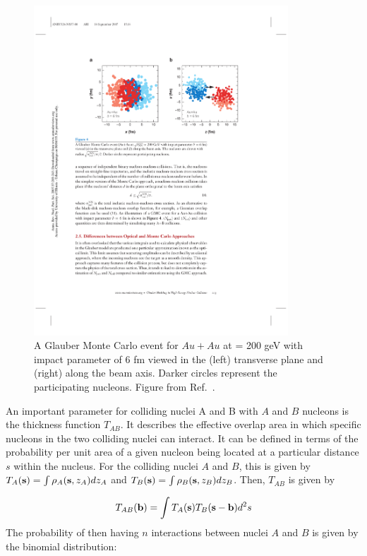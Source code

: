 \begin{figure}[htbp]
\begin{center}
\includegraphics[width=0.85\textwidth]{figures/theory/glauberMC}
\caption{A Glauber Monte Carlo event for $Au+Au$ at \sqrtsnn = 200 geV with impact parameter of 6 fm viewed in the (left) transverse plane and (right) along the beam axis.
Darker circles represent the participating nucleons.
Figure from Ref.~\cite{doi:10.1146/annurev.nucl.57.090506.123020}.}
\label{fig:glauberMC}
\end{center}
\end{figure}

An important parameter for colliding nuclei A and B with $A$ and $B$ nucleons is the thickness function $T_{AB}$.
It describes the effective overlap area in which specific nucleons in the two colliding nuclei can interact.
It can be defined in terms of the probability per unit area of a given nucleon being located at a particular distance $s$ within the nucleus.
For the colliding nuclei $A$ and $B$, this is given by $T_{A}({\bf{s}}) = \int \rho_A ({\bf{s}}, z_A) dz_{A}$ and $T_{B}({\bf{s}}) = \int \rho_B ({\bf{s}}, z_B) dz_{B}$.
Then, $T_{AB}$ is given by

\begin{align}
T_{AB}({\bf b}) = \int T_{A} ({\bf s}) T_{B} ({\bf s-\bf b}) d^2 s
\end{align}
The probability of then having $n$ interactions between nuclei $A$ and $B$ is given by the binomial distribution:

